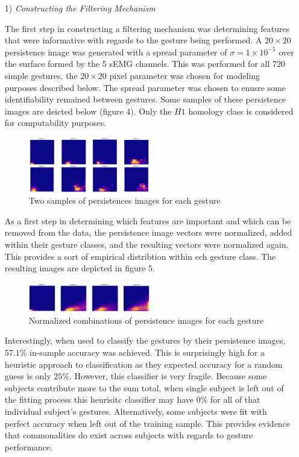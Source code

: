 \documentclass[11pt]{article}
\begin{document}
\begin{enumerate}
\begin{enumerate}
\item[1)] \textit{Constructing the Filtering Mechanism}

The first step in constructing a filtering mechanism was determining features that were informative with regards to the gesture being performed. A $20 \times 20$ persistence image was generated with a spread parameter of $\sigma = 1\times 10^{-5}$ over the surface formed by the 5 sEMG channels. This was performed for all 720 simple gestures. the $20 \times 20$ pixel parameter was chosen for modeling purposes described below. The spread parameter was chosen to enusre some identifiability remained between gestures. Some samples of these persistence images are deicted below (figure 4). Only the $H1$ homology class is considered for computability purposes.

\begin{figure}[h]
\centering
\includegraphics[width=0.5\textwidth]{persim_smpl}
\caption{Two samples of persistences images for each gesture}
\end{figure}

As a first step in determining which features are important and which can be removed from the data, the persistence image vectors were normalized, added within their gesture classes, and the resulting vectors were normalized again. This provides a sort of empirical distribtion within ech gesture class. The resulting images are depicted in figure 5.

\begin{figure}[h]
\centering
\includegraphics[width=0.5\textwidth]{comb_pims}
\caption{Normalized combinations of persistence images for each gesture}
\end{figure}

Interestingly, when used to classify the gestures by their persistence images, $57.1\%$ in-sample accuracy was achieved. This is surprisingly high for a heuristic approach to classification as they expected accuracy for a random guess is only $25\%$. However, this classifier is very fragile. Because some subjects contribute more to the sum total, when single subject is left out of the fitting process this heurisitc classifier may have $0\%$ for all of that individual subject's gestures. Alternatively, some subjects were fit with perfect accuracy when left out of the training sample. This provides evidence that commonalities do exist across subjects with regards to gesture performance.


\end{enumerate}
\end{enumerate}
\end{document}
